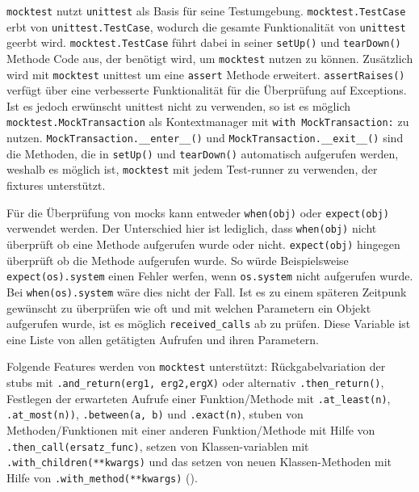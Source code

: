 \lstinline{mocktest} nutzt \lstinline{unittest} als Basis für seine
Testumgebung. \lstinline{mocktest.TestCase} erbt von
\lstinline{unittest.TestCase}, wodurch die gesamte Funktionalität von
\lstinline{unittest} geerbt wird. \lstinline{mocktest.TestCase} führt dabei in
seiner \lstinline{setUp()} und \lstinline{tearDown()} Methode Code aus, der
benötigt wird, um \lstinline{mocktest} nutzen zu können. Zusätzlich wird mit
\lstinline{mocktest} unittest um eine \lstinline{assert} Methode erweitert.
\lstinline{assertRaises()} verfügt über eine verbesserte Funktionalität für die
Überprüfung auf Exceptions. Ist es jedoch erwünscht unittest nicht zu verwenden,
so ist es möglich \lstinline{mocktest.MockTransaction} als Kontextmanager mit
\lstinline{with MockTransaction:} zu nutzen.
\lstinline{MockTransaction.__enter__()} und
\lstinline{MockTransaction.__exit__()} sind die Methoden, die in
\lstinline{setUp()} und \lstinline{tearDown()} automatisch aufgerufen werden,
weshalb es möglich ist, \lstinline{mocktest} mit jedem Test-runner zu verwenden,
der \Glspl{fixture} unterstützt.
\newline

Für die Überprüfung von \Glspl{mock} kann entweder \lstinline{when(obj)} oder
\lstinline{expect(obj)} verwendet werden. Der Unterschied hier ist lediglich,
dass \lstinline{when(obj)} nicht überprüft ob eine Methode aufgerufen wurde oder
nicht. \lstinline{expect(obj)} hingegen überprüft ob die Methode aufgerufen
wurde. So würde Beispielsweise \lstinline{expect(os).system} einen Fehler
werfen, wenn \lstinline{os.system} nicht aufgerufen wurde. Bei
\lstinline{when(os).system} wäre dies nicht der Fall. Ist es zu einem späteren
Zeitpunk gewünscht zu überprüfen wie oft und mit welchen Parametern ein Objekt
aufgerufen wurde, ist es möglich \lstinline{received_calls} ab zu prüfen. Diese
Variable ist eine Liste von allen getätigten Aufrufen und ihren Parametern.
\newline

Folgende Features werden von \lstinline{mocktest} unterstützt:
Rückgabelvariation der \Glspl{stub} mit
\lstinline{.and_return(erg1, erg2,ergX)} oder alternativ
\lstinline{.then_return()}, Festlegen der erwarteten Aufrufe einer
Funktion/Methode mit \lstinline{.at_least(n)}, \lstinline{.at_most(n))},
\lstinline{.between(a, b)} und \lstinline{.exact(n)}, \gls{stub}en von
Methoden/Funktionen mit einer anderen Funktion/Methode mit Hilfe von
\lstinline{.then_call(ersatz_func)}, setzen von Klassen-variablen mit
\lstinline{.with_children(**kwargs)} und das setzen von neuen Klassen-Methoden
mit Hilfe von \lstinline{.with_method(**kwargs)} (\cite{mocktest:doc}).
\newline

